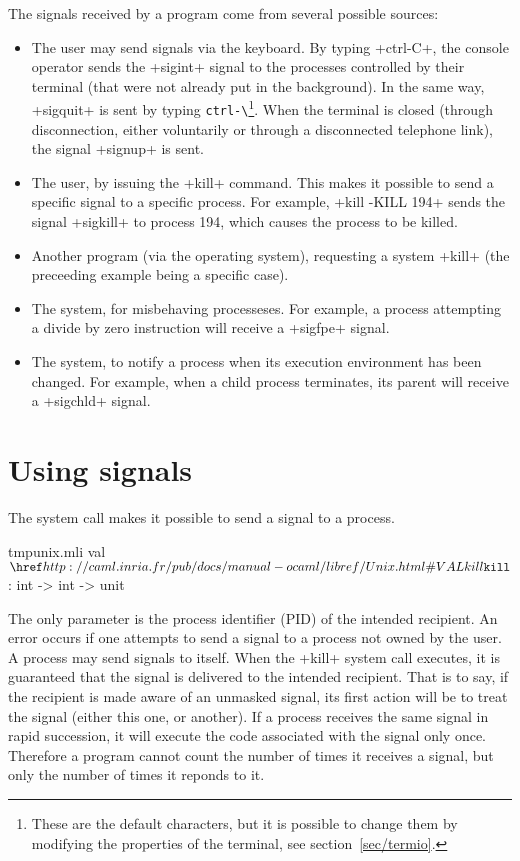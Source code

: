 The signals received by a program come from several possible sources:
%
\begin{itemize}

\item The user may send signals via the keyboard.  By typing \ml+ctrl-C+,
  the console operator sends the \ml+sigint+ signal to the processes
  controlled by their terminal (that were not already put in the background).
  In the same way, \ml+sigquit+ is sent by typing \verb'ctrl-\'\footnote{These 
    are the default characters, but it is possible to change them by 
    modifying the properties of the terminal, see section~\ref {sec/termio}.}.  
  When the terminal is closed (through disconnection, either voluntarily 
  or through a disconnected telephone link), the signal \ml+signup+ is sent.

\item The user, by issuing the \ml+kill+ command.  This makes it possible 
  to send a specific signal to a specific process.  For example, 
  \ml+kill -KILL 194+ sends the signal \ml+sigkill+ to process 194, which 
  causes the process to be killed.

\item Another program (via the operating system), requesting a system 
  \ml+kill+ (the preceeding example being a specific case).

\item The system, for misbehaving processeses.  For example, a process 
  attempting a divide by zero instruction will receive  a \ml+sigfpe+ signal.

\item The system, to notify a process when its execution environment has 
  been changed.  For example, when a child process terminates, its parent 
  will receive a \ml+sigchld+ signal.

\end{itemize}


\section{Using signals}

The system call  makes it possible to send a
signal to a process.

%
\begin{listingcodefile}{tmpunix.mli}
val $\libvalue{Unix}{kill}$ : int -> int -> unit
\end{listingcodefile}
%
The only parameter is the process identifier (PID) of the intended 
recipient.  An error occurs if one attempts to send a signal
to a process not owned by the user.  A process may send signals to 
itself.  When the \ml+kill+ system call executes, it is guaranteed
that the signal is delivered to the intended recipient.  That is to say, 
if the recipient is made aware of an unmasked signal, its first action
will be to treat the signal (either this one, or another). If a process 
receives the same signal in rapid succession, it will execute the code 
associated with the signal only once.  Therefore a program cannot 
count the number of times it receives a signal, but only the number 
of times it reponds to it.

